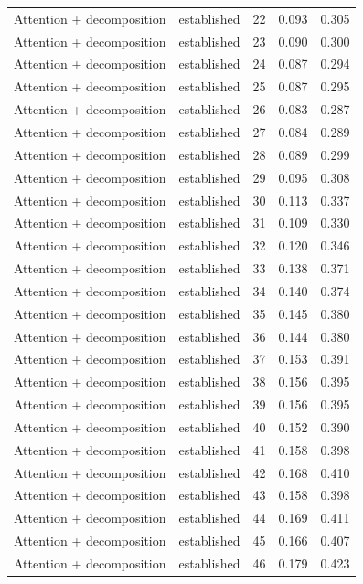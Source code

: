 \begin{tabular}{llrrr}
Attention + decomposition & established & 22 & 0.093 & 0.305 \\
Attention + decomposition & established & 23 & 0.090 & 0.300 \\
Attention + decomposition & established & 24 & 0.087 & 0.294 \\
Attention + decomposition & established & 25 & 0.087 & 0.295 \\
Attention + decomposition & established & 26 & 0.083 & 0.287 \\
Attention + decomposition & established & 27 & 0.084 & 0.289 \\
Attention + decomposition & established & 28 & 0.089 & 0.299 \\
Attention + decomposition & established & 29 & 0.095 & 0.308 \\
Attention + decomposition & established & 30 & 0.113 & 0.337 \\
Attention + decomposition & established & 31 & 0.109 & 0.330 \\
Attention + decomposition & established & 32 & 0.120 & 0.346 \\
Attention + decomposition & established & 33 & 0.138 & 0.371 \\
Attention + decomposition & established & 34 & 0.140 & 0.374 \\
Attention + decomposition & established & 35 & 0.145 & 0.380 \\
Attention + decomposition & established & 36 & 0.144 & 0.380 \\
Attention + decomposition & established & 37 & 0.153 & 0.391 \\
Attention + decomposition & established & 38 & 0.156 & 0.395 \\
Attention + decomposition & established & 39 & 0.156 & 0.395 \\
Attention + decomposition & established & 40 & 0.152 & 0.390 \\
Attention + decomposition & established & 41 & 0.158 & 0.398 \\
Attention + decomposition & established & 42 & 0.168 & 0.410 \\
Attention + decomposition & established & 43 & 0.158 & 0.398 \\
Attention + decomposition & established & 44 & 0.169 & 0.411 \\
Attention + decomposition & established & 45 & 0.166 & 0.407 \\
Attention + decomposition & established & 46 & 0.179 & 0.423 \\

\end{tabular}
